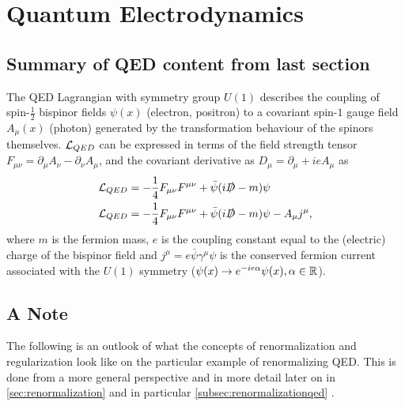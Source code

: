 \section{Quantum Electrodynamics}
\subsection{Summary of QED content from last section}
The QED Lagrangian with symmetry group $U(1)$ describes the coupling of spin-$\frac{1}{2}$ bispinor fields $\psi(x)$ (electron, positron) to a covariant spin-$1$ gauge field $A_{\mu}(x)$ (photon) generated by the transformation behaviour of the spinors themselves. $\mathcal{L}_{QED}$ can be expressed in terms of the field strength tensor $F_{\mu \nu} = \partial_{\mu} A_{\nu} - \partial_{\nu} A_{\mu}$, and the covariant derivative as $D_{\mu} = \partial_{\mu} + i e A_{\mu}$ as
\begin{align}
	\mathcal{L}_{QED} &= - \frac{1}{4} F_{\mu \nu} F^{\mu \nu} + \bar{\psi} (i \slashed{D} - m) \psi \\
	\mathcal{L}_{QED} &= - \frac{1}{4} F_{\mu \nu} F^{\mu \nu}+ \bar{\psi} (i \slashed{D} -m) \psi - A_{\mu}j^{\mu},
\end{align}
where $m$ is the fermion mass, $e$ is the coupling constant equal to the (electric) charge of the bispinor field and $j^{\mu} = e \bar{\psi} \gamma^{\mu} \psi$ is the conserved fermion current associated with the $U(1)$ symmetry ($\psi(x) \rightarrow e^{- i e \alpha} \psi(x), \alpha \in \mathbb{R}$).
\subsection{A Note}
The following is an outlook of what the concepts of renormalization and regularization look like on the particular example of renormalizing QED. This is done from a more general perspective and in more detail later on in \ref{sec:renormalization} and in particular \ref{subsec:renormalizationqed} .
